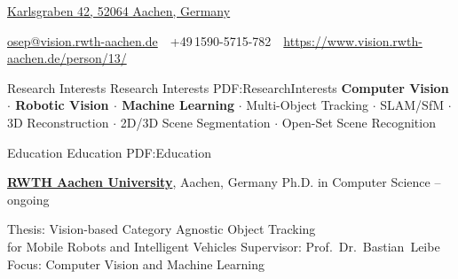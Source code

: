 \documentclass[letterpaper,MMMyyyy,nonstopmode]{simpleresumecv}
\newcommand{\CVAuthor}{Aljoša Ošep}
\newcommand{\CVWebpage}{https://www.vision.rwth-aachen.de/person/13/}
\begin{document}

\Title{\CVAuthor}

\begin{SubTitle}
\href{https://www.google.com/maps/place/Karlsgraben+42,+52064+Aachen}
{Karlsgraben 42, 52064 Aachen, Germany}
\par
\href{mailto:osep@vision.rwth-aachen.de}
{osep@vision.rwth-aachen.de}
\,\SubBulletSymbol\,
+49\,1590-5715-782
\,\SubBulletSymbol\,
\href{\CVWebpage}
{\url{\CVWebpage}}
\end{SubTitle}

\begin{Body}

\Section
{Research Interests}
{Research Interests}
{PDF:ResearchInterests}
\textbf{Computer Vision  $\cdot$ Robotic Vision  $\cdot$  Machine Learning} $\cdot$
Multi-Object Tracking $\cdot$ SLAM/SfM $\cdot$ 3D Reconstruction $\cdot$ 2D/3D Scene Segmentation $\cdot$ Open-Set Scene Recognition 


\Section
{Education}
{Education}
{PDF:Education}


\Entry
\href{http://www.rwth-aachen.de}
{\textbf{RWTH Aachen University}},
Aachen, Germany
\Gap
\BulletItem
Ph.D. in Computer Science
\hfill
{} --
ongoing
\begin{Detail}
\SubBulletItem
Thesis:
{Vision-based Category Agnostic Object Tracking \\for Mobile Robots and Intelligent Vehicles}
\SubBulletItem
Supervisor:
Prof.~Dr.~Bastian~Leibe
\SubBulletItem
Focus:
Computer Vision and Machine Learning
\end{Detail}
%


\end{Body}
\end{document}
